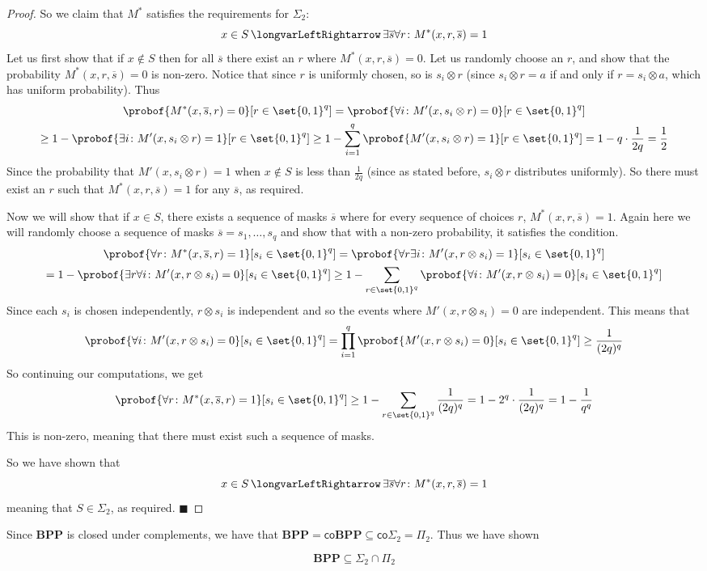\documentclass[10pt]{article}
\def\iff{\,\longvarLeftRightarrow\,}
\def\co{\mathsf{co}}
\def\BPP{\mathbf{BPP}}
\def\qed{%
    \ifmmode%
        \eqno\blacksquare%
    \else%
        \hskip1cm\allowbreak\hbox{}\nobreak\hfill$\blacksquare$%
    \fi%
}
\begin{document}
\begin{proof}
    So we claim that $M^*$ satisfies the requirements for $\Sigma_2$:
    \[ x\in S \iff \exists\overline s\forall r\colon M^*(x,r,\overline s)=1 \]
    Let us first show that if $x\notin S$ then for all $\overline s$ there exist an $r$ where $M^*(x,r,\overline s)=0$.
    Let us randomly choose an $r$, and show that the probability $M^*(x,r,\overline s)=0$ is non-zero.
    Notice that since $r$ is uniformly chosen, so is $s_i\otimes r$ (since $s_i\otimes r=a$ if and only if $r=s_i\otimes a$, which has uniform probability).
    Thus
    \begin{multline*}
        \probof{M^*(x,\overline s,r)=0}[r\in\set{0,1}^q] = \probof{\forall i\colon M'(x,s_i\otimes r)=0}[r\in\set{0,1}^q] \\
        \geq 1 - \probof{\exists i\colon M'(x,s_i\otimes r)=1}[r\in\set{0,1}^q] \geq 1- \sum_{i=1}^q\probof{M'(x,s_i\otimes r)=1}[r\in\set{0,1}^q] = 1- q\cdot\frac1{2q} = \frac12
    \end{multline*}
    Since the probability that $M'(x,s_i\otimes r)=1$ when $x\notin S$ is less than $\frac1{2q}$ (since as stated before, $s_i\otimes r$ distributes uniformly).
    So there must exist an $r$ such that $M^*(x,r,\overline s)=1$ for any $\overline s$, as required.

    Now we will show that if $x\in S$, there exists a sequence of masks $\overline s$ where for every sequence of choices $r$, $M^*(x,r,\overline s)=1$.
    Again here we will randomly choose a sequence of masks $\overline s=s_1,\dots,s_q$ and show that with a non-zero probability, it satisfies the condition.
    \begin{multline*}
        \probof{\forall r\colon M^*(x,\overline s,r)=1}[s_i\in\set{0,1}^q] = \probof{\forall r\exists i\colon M'(x,r\otimes s_i)=1}[s_i\in\set{0,1}^q] \\
        = 1 - \probof{\exists r\forall i\colon M'(x,r\otimes s_i)=0}[s_i\in\set{0,1}^q] \geq 1 - \sum_{r\in\set{0,1}^q}\probof{\forall i\colon M'(x,r\otimes s_i)=0}[s_i\in\set{0,1}^q]
    \end{multline*}
    Since each $s_i$ is chosen independently, $r\otimes s_i$ is independent and so the events where $M'(x,r\otimes s_i)=0$ are independent.
    This means that
    \[ \probof{\forall i\colon M'(x,r\otimes s_i)=0}[s_i\in\set{0,1}^q] = \prod_{i=1}^q\probof{M'(x,r\otimes s_i)=0}[s_i\in\set{0,1}^q] \geq \frac1{(2q)^q} \]
    So continuing our computations, we get
    \[ \probof{\forall r\colon M^*(x,\overline s,r)=1}[s_i\in\set{0,1}^q] \geq 1 - \sum_{r\in\set{0,1}^q}\frac1{(2q)^q} = 1 - 2^q\cdot\frac1{(2q)^q} = 1 - \frac1{q^q} \]
    This is non-zero, meaning that there must exist such a sequence of masks.

    So we have shown that
    \[ x\in S \iff \exists\overline s\forall r\colon M^*(x,r,\overline s)=1 \]
    meaning that $S\in\Sigma_2$, as required.
    \qed

\end{proof}

Since $\BPP$ is closed under complements, we have that $\BPP=\co\BPP\subseteq\co\Sigma_2=\Pi_2$.
Thus we have shown

\begin{coro*}

    \[ \BPP \subseteq \Sigma_2\cap\Pi_2 \]

\end{coro*}
\end{document}

